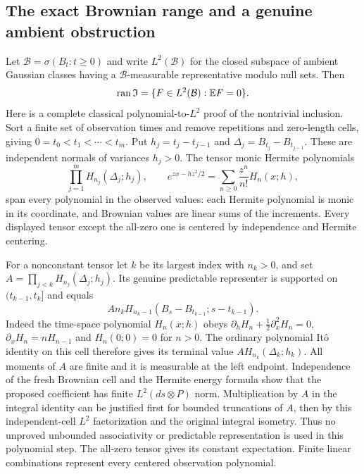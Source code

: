 \documentclass[11pt]{article}
\begin{document}
\subsection*{The exact Brownian range and a genuine ambient obstruction}
Let $\mathcal B=\sigma(B_t:t\geq0)$ and write $L^2(\mathcal B)$
for the closed subspace of ambient Gaussian classes having a
$\mathcal B$-measurable representative modulo null sets. Then
\begin{equation}\label{eq:exactBrownianrange}
 \operatorname{ran}\mathfrak I
       =\{F\in L^2(\mathcal B):\mathbb E F=0\}.
\end{equation}
Here is a complete classical polynomial-to-$L^2$ proof of the
nontrivial inclusion. Sort a finite set of observation times and
remove repetitions and zero-length cells, giving
$0=t_0<t_1<\cdots<t_m$. Put $h_j=t_j-t_{j-1}$ and
$\Delta_j=B_{t_j}-B_{t_{j-1}}$. These are independent normals
of variances $h_j>0$. The tensor monic Hermite polynomials
\[
 \prod_{j=1}^m H_{n_j}(\Delta_j;h_j),\qquad
 e^{zx-hz^2/2}=\sum_{n\geq0}\frac{z^n}{n!}H_n(x;h),
\]
span every polynomial in the observed values: each Hermite
polynomial is monic in its coordinate, and Brownian values are
linear sums of the increments. Every displayed tensor except the
all-zero one is centered by independence and Hermite centering.

For a nonconstant tensor let $k$ be its largest index with
$n_k>0$, and set
$A=\prod_{j<k}H_{n_j}(\Delta_j;h_j)$. Its genuine predictable
representer is supported on $(t_{k-1},t_k]$ and equals
\[
 A n_k H_{n_k-1}
       (B_s-B_{t_{k-1}};s-t_{k-1}).
\]
Indeed the time-space polynomial $H_n(x;h)$ obeys
$\partial_hH_n+\tfrac12\partial_x^2H_n=0$,
$\partial_xH_n=nH_{n-1}$ and $H_n(0;0)=0$ for $n>0$.
The ordinary polynomial It\^o identity on this cell therefore
gives its terminal value $A H_{n_k}(\Delta_k;h_k)$.
All moments of $A$ are finite and it is measurable at the left
endpoint. Independence of the fresh Brownian cell and the Hermite
energy formula show that the proposed coefficient has finite
$L^2(ds\otimes P)$ norm. Multiplication by $A$ in the integral
identity can be justified first for bounded truncations of $A$,
then by this independent-cell $L^2$ factorization and the original
integral isometry. Thus no unproved unbounded associativity or
predictable representation is used in this polynomial step.
The all-zero tensor gives its constant expectation. Finite linear
combinations represent every centered observation polynomial.
\end{document}
